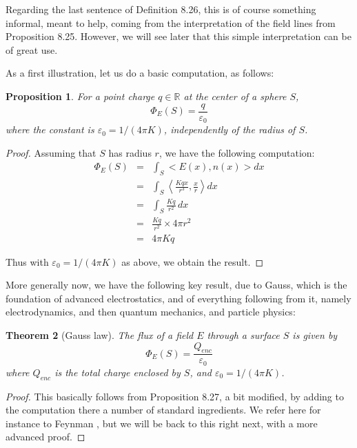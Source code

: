 \documentclass[12pt]{amsbook}
\newtheorem{theorem}{Theorem}[chapter]
\newtheorem{proposition}[theorem]{Proposition}
\begin{document}
\bigskip

Regarding the last sentence of Definition 8.26, this is of course something informal, meant to help, coming from the interpretation of the field lines from Proposition 8.25. However, we will see later that this simple interpretation can be of great use.

\bigskip

As a first illustration, let us do a basic computation, as follows:

\begin{proposition}
For a point charge $q\in\mathbb R$ at the center of a sphere $S$,
$$\Phi_E(S)=\frac{q}{\varepsilon_0}$$
where the constant is $\varepsilon_0=1/(4\pi K)$, independently of the radius of $S$.
\end{proposition}

\begin{proof}
Assuming that $S$ has radius $r$, we have the following computation:
\begin{eqnarray*}
\Phi_E(S)
&=&\int_S<E(x),n(x)>dx\\
&=&\int_S\left<\frac{Kqx}{r^3},\frac{x}{r}\right>dx\\
&=&\int_S\frac{Kq}{r^2}\,dx\\
&=&\frac{Kq}{r^2}\times 4\pi r^2\\
&=&4\pi Kq
\end{eqnarray*} 

Thus with $\varepsilon_0=1/(4\pi K)$ as above, we obtain the result.
\end{proof}

More generally now, we have the following key result, due to Gauss, which is the foundation of advanced electrostatics, and of everything following from it, namely electrodynamics, and then quantum mechanics, and particle physics:

\begin{theorem}[Gauss law]
The flux of a field $E$ through a surface $S$ is given by
$$\Phi_E(S)=\frac{Q_{enc}}{\varepsilon_0}$$
where $Q_{enc}$ is the total charge enclosed by $S$, and $\varepsilon_0=1/(4\pi K)$.
\end{theorem}

\begin{proof}
This basically follows from Proposition 8.27, a bit modified, by adding to the computation there a number of standard ingredients. We refer here for instance to Feynman \cite{fe1}, but we will be back to this right next, with a more advanced proof. 
\end{proof}
\end{document}
